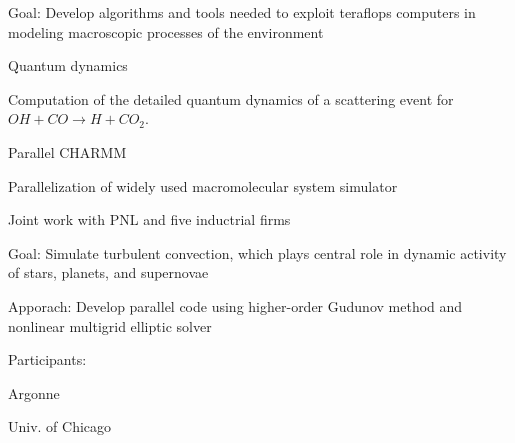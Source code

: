 \begin{small}
\begin{mainpts}
\item Goal: Develop algorithms and tools needed to exploit teraflops computers
in modeling macroscopic processes of the environment

\item Quantum dynamics 

Computation of the detailed quantum dynamics of a scattering event for $OH + CO
\rightarrow H + CO_2$.

\item Parallel CHARMM

Parallelization of widely used macromolecular system simulator

Joint work with PNL and five inductrial firms

\end{mainpts}
\end{small}
\ve


\begin{small}
\begin{mainpts}
\item Goal: Simulate turbulent convection, which plays central role in dynamic
activity of stars, planets, and supernovae

\item Apporach: Develop parallel code using higher-order Gudunov method and
nonlinear multigrid  elliptic solver

\item Participants:
\begin{secpts}
\item Argonne
\item Univ. of Chicago
\end{secpts}


\end{mainpts}


\end{small}
\ve

